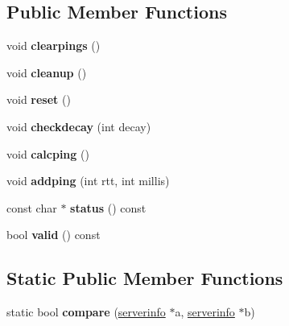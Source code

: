 \subsection*{Public Member Functions}
\begin{DoxyCompactItemize}
\item 
\mbox{\label{structserverinfo_a8b3f8b9fa5e67d18702c9ac851af157b}} 
void {\bfseries clearpings} ()
\item 
\mbox{\label{structserverinfo_a22fbbb7b67142e3d392a31d4c6c5e092}} 
void {\bfseries cleanup} ()
\item 
\mbox{\label{structserverinfo_a09ba18be77a73c7a5152a4ea2e31ba2e}} 
void {\bfseries reset} ()
\item 
\mbox{\label{structserverinfo_ad1e318815a294883a5de514b5972de8d}} 
void {\bfseries checkdecay} (int decay)
\item 
\mbox{\label{structserverinfo_af2ce01f2911250eca58300379071501e}} 
void {\bfseries calcping} ()
\item 
\mbox{\label{structserverinfo_a258f78bc659b228253f2321fe5286d7a}} 
void {\bfseries addping} (int rtt, int millis)
\item 
\mbox{\label{structserverinfo_aa870744206b96341855dfdfc65199427}} 
const char $\ast$ {\bfseries status} () const
\item 
\mbox{\label{structserverinfo_ae1f4a80f19b24f38589f89844417dfc7}} 
bool {\bfseries valid} () const
\end{DoxyCompactItemize}
\subsection*{Static Public Member Functions}
\begin{DoxyCompactItemize}
\item 
\mbox{\label{structserverinfo_a9459d10b7d4a2823c678f56a3fa0474f}} 
static bool {\bfseries compare} (\hyperlink{structserverinfo}{serverinfo} $\ast$a, \hyperlink{structserverinfo}{serverinfo} $\ast$b)
\end{DoxyCompactItemize}

